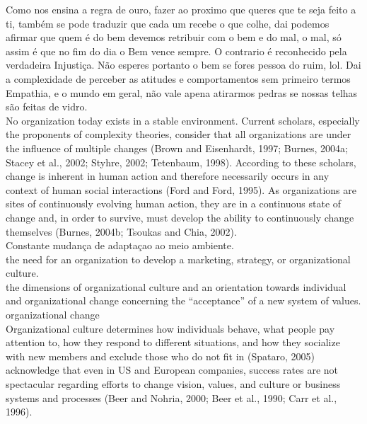Como nos ensina a regra de ouro, fazer ao proximo que queres que te seja feito a ti, também se pode traduzir que cada um recebe o que colhe, dai podemos afirmar que quem é do bem devemos retribuir com o bem e do mal, o mal, só assim é que no fim do dia o Bem vence sempre. O contrario é reconhecido pela verdadeira Injustiça. Não esperes portanto o bem se fores pessoa do ruim, lol. Dai a complexidade de perceber as atitudes e comportamentos sem primeiro termos Empathia, e o mundo em geral, não vale apena atirarmos pedras se nossas telhas são feitas de vidro.\\
No organization today exists in a stable environment. Current scholars, especially the
proponents of complexity theories, consider that all organizations are under the influence
of multiple changes (Brown and Eisenhardt, 1997; Burnes, 2004a; Stacey et al., 2002;
Styhre, 2002; Tetenbaum, 1998). According to these scholars, change is inherent in
human action and therefore necessarily occurs in any context of human social interactions
(Ford and Ford, 1995). As organizations are sites of continuously evolving human action,
they are in a continuous state of change and, in order to survive, must develop the ability
to continuously change themselves (Burnes, 2004b; Tsoukas and Chia, 2002).\\

Constante mudança de adaptaçao ao meio ambiente.\\

the need for an organization to develop a marketing, strategy, or organizational culture.\\
the dimensions of organizational culture and an orientation towards individual and organizational change concerning the “acceptance” of a new system of values.\\

organizational change \\

Organizational culture determines how individuals behave, what people pay attention to,
how they respond to different situations, and how they socialize with new members and
exclude those who do not fit in (Spataro, 2005) \\

acknowledge that even in US and European companies, success rates are
not spectacular regarding efforts to change vision, values, and culture or business systems
and processes (Beer and Nohria, 2000; Beer et al., 1990; Carr et al., 1996).\\

